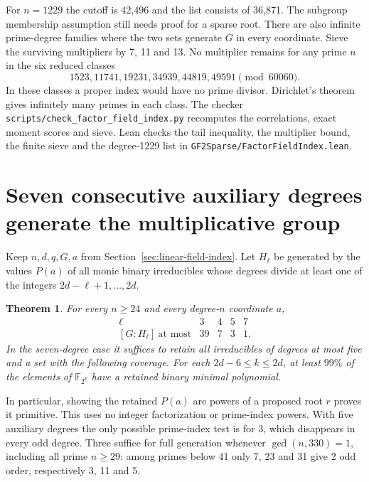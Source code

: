 \documentclass[11pt]{article}
\newtheorem{theorem}{Theorem}
\begin{document}
For \(n=1229\) the cutoff is 42,496 and the list consists of 36,871.
The subgroup membership assumption still needs proof for a sparse root.
There are also infinite prime-degree families where the two sets generate
\(G\) in every coordinate. Sieve the surviving multipliers by 7, 11 and
13. No multiplier remains for any prime \(n\) in the six reduced classes
\[
          1523,11741,19231,34939,44819,49591\pmod{60060}.
\]
In these classes a proper index would have no prime divisor. Dirichlet's
theorem gives infinitely many primes in each class.
The checker \nolinkurl{scripts/check_factor_field_index.py} recomputes
the correlations, exact moment scores and sieve.
Lean checks the tail inequality, the multiplier bound, the finite
sieve and the degree-1229 list in \nolinkurl{GF2Sparse/FactorFieldIndex.lean}.

\clearpage
\section{Seven consecutive auxiliary degrees generate the multiplicative group}
\label{sec:seven-fields}
Keep \(n,d,q,G,a\) from Section~\ref{sec:linear-field-index}. Let
\(H_\ell\) be generated by the values \(P(a)\) of all monic binary
irreducibles whose degrees divide at least one of the integers
\(2d-\ell+1,\ldots,2d\).

\begin{theorem}\label{thm:seven-fields}
For every \(n\ge24\) and every degree-\(n\) coordinate \(a\),
\[
\begin{array}{c|rrrr}
\ell&3&4&5&7\\\hline
 [G:H_\ell]\ \text{at most}&39&7&3&1 .
\end{array}
\]
In the seven-degree case it suffices to retain all irreducibles of
degrees at most five and a set with the following coverage.
For each \(2d-6\le k\le2d\), at least \(99\%\) of the elements of
\(\mathbb F_{2^k}\) have a retained binary minimal polynomial.
\end{theorem}
In particular, showing the retained \(P(a)\) are powers of a proposed
root \(r\) proves it primitive. This uses no integer factorization
or prime-index powers. With five auxiliary degrees the only possible
prime-index test is for 3, which disappears in every odd degree.
Three suffice for full generation whenever \(\gcd(n,330)=1\),
including all prime \(n\ge29\): among primes below 41 only 7, 23
and 31 give 2 odd order, respectively 3, 11 and 5.
\end{document}
